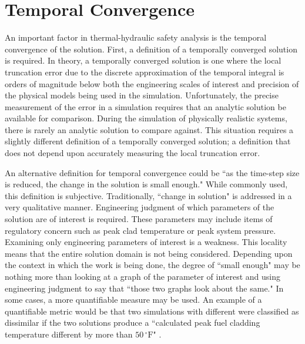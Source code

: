 \section{Temporal Convergence}
\label{sect:temporal_convergence}

An important factor in thermal-hydraulic safety analysis is the temporal convergence of the solution.
First, a definition of a temporally converged solution is required.
In theory, a temporally converged solution is one where the local truncation error due to the discrete approximation of the temporal integral is orders of magnitude below both the engineering scales of interest and precision of the physical models being used in the simulation.
Unfortunately, the precise measurement of the error in a simulation requires that an analytic solution be available for comparison.
During the simulation of physically realistic systems, there is rarely an analytic solution to compare against.
This situation requires a slightly different definition of a temporally converged solution; a definition that does not depend upon accurately measuring the local truncation error.

An alternative definition for temporal convergence could be ``as the time-step size is reduced, the change in the solution is small enough."
While commonly used, this definition is subjective.
Traditionally, ``change in solution" is addressed in a very qualitative manner.
Engineering judgment of which parameters of the solution are of interest is required.
These parameters may include items of regulatory concern such as peak clad temperature or peak system pressure.
Examining only engineering parameters of interest is a weakness.
This locality means that the entire solution domain is not being considered.
Depending upon the context in which the work is being done, the degree of ``small enough" may be nothing more than looking at a graph of the parameter of interest and using engineering judgment to say that ``those two graphs look about the same."
In some cases, a more quantifiable measure may be used.
An example of a quantifiable metric would be that two simulations with different \dtmax{} were classified as dissimilar if the two solutions produce a ``calculated peak fuel cladding temperature different by more than $50\,^{\circ}\mathrm{F}$" \cite{CFR10}.

